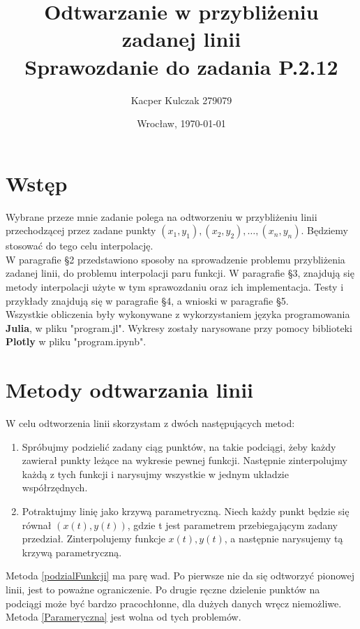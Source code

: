 \documentclass{article}
\author{Kacper Kulczak 279079}
\date{Wrocław, \today}
\title{\textbf{Odtwarzanie w przybliżeniu zadanej linii } \\ Sprawozdanie do zadania P.2.12}
\begin{document}
\maketitle

\section{Wstęp}

Wybrane przeze mnie zadanie polega na odtworzeniu w przybliżeniu linii przechodzącej przez zadane punkty $(x_1,y_1),(x_2,y_2),\dots,(x_n,y_n)$. Będziemy stosować do tego celu interpolację.\\

W paragrafie \S 2 przedstawiono sposoby na sprowadzenie problemu przybliżenia zadanej linii, do problemu interpolacji paru funkcji. W paragrafie \S3, znajdują się metody interpolacji użyte w tym sprawozdaniu oraz ich implementacja. Testy i przykłady znajdują się w paragrafie \S4, a wnioski w paragrafie \S5.\\

Wszystkie obliczenia były wykonywane  z wykorzystaniem języka programowania \textbf{Julia}, w pliku "program.jl". Wykresy zostały narysowane przy pomocy biblioteki \textbf{Plotly} w pliku "program.ipynb".



\section{Metody odtwarzania linii}
W celu odtworzenia linii skorzystam z dwóch następujących metod:
\begin{enumerate}
	\item \label{podzialFunkcji}Spróbujmy podzielić zadany ciąg punktów, na takie podciągi, żeby każdy zawierał punkty leżące na wykresie pewnej funkcji. Następnie zinterpolujmy  każdą z tych funkcji i narysujmy wszystkie w jednym układzie współrzędnych.
	
	\item \label{Parameryczna} Potraktujmy linię jako krzywą parametryczną. Niech każdy punkt będzie się równał $(x(t),y(t))$, gdzie t jest parametrem przebiegającym zadany przedział. Zinterpolujemy funkcje $x(t), y(t)$, a następnie narysujemy tą krzywą parametryczną.
\end{enumerate}

Metoda \ref{podzialFunkcji} ma parę wad. Po pierwsze nie da się odtworzyć pionowej linii, jest to poważne ograniczenie. Po drugie ręczne dzielenie punktów na podciągi może być bardzo pracochłonne, dla dużych danych wręcz niemożliwe. Metoda \ref{Parameryczna} jest wolna od tych problemów.
\end{document}
